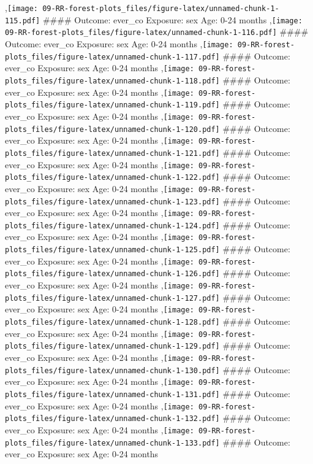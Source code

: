 \documentclass[
  9pt,
]{book}
\begin{document}
,\texttt{[image: 09-RR-forest-plots\_files/figure-latex/unnamed-chunk-1-115.pdf]}
\#\#\#\# Outcome: ever\_co Exposure: sex Age: 0-24 months
,\texttt{[image: 09-RR-forest-plots\_files/figure-latex/unnamed-chunk-1-116.pdf]}
\#\#\#\# Outcome: ever\_co Exposure: sex Age: 0-24 months
,\texttt{[image: 09-RR-forest-plots\_files/figure-latex/unnamed-chunk-1-117.pdf]}
\#\#\#\# Outcome: ever\_co Exposure: sex Age: 0-24 months
,\texttt{[image: 09-RR-forest-plots\_files/figure-latex/unnamed-chunk-1-118.pdf]}
\#\#\#\# Outcome: ever\_co Exposure: sex Age: 0-24 months
,\texttt{[image: 09-RR-forest-plots\_files/figure-latex/unnamed-chunk-1-119.pdf]}
\#\#\#\# Outcome: ever\_co Exposure: sex Age: 0-24 months
,\texttt{[image: 09-RR-forest-plots\_files/figure-latex/unnamed-chunk-1-120.pdf]}
\#\#\#\# Outcome: ever\_co Exposure: sex Age: 0-24 months
,\texttt{[image: 09-RR-forest-plots\_files/figure-latex/unnamed-chunk-1-121.pdf]}
\#\#\#\# Outcome: ever\_co Exposure: sex Age: 0-24 months
,\texttt{[image: 09-RR-forest-plots\_files/figure-latex/unnamed-chunk-1-122.pdf]}
\#\#\#\# Outcome: ever\_co Exposure: sex Age: 0-24 months
,\texttt{[image: 09-RR-forest-plots\_files/figure-latex/unnamed-chunk-1-123.pdf]}
\#\#\#\# Outcome: ever\_co Exposure: sex Age: 0-24 months
,\texttt{[image: 09-RR-forest-plots\_files/figure-latex/unnamed-chunk-1-124.pdf]}
\#\#\#\# Outcome: ever\_co Exposure: sex Age: 0-24 months
,\texttt{[image: 09-RR-forest-plots\_files/figure-latex/unnamed-chunk-1-125.pdf]}
\#\#\#\# Outcome: ever\_co Exposure: sex Age: 0-24 months
,\texttt{[image: 09-RR-forest-plots\_files/figure-latex/unnamed-chunk-1-126.pdf]}
\#\#\#\# Outcome: ever\_co Exposure: sex Age: 0-24 months
,\texttt{[image: 09-RR-forest-plots\_files/figure-latex/unnamed-chunk-1-127.pdf]}
\#\#\#\# Outcome: ever\_co Exposure: sex Age: 0-24 months
,\texttt{[image: 09-RR-forest-plots\_files/figure-latex/unnamed-chunk-1-128.pdf]}
\#\#\#\# Outcome: ever\_co Exposure: sex Age: 0-24 months
,\texttt{[image: 09-RR-forest-plots\_files/figure-latex/unnamed-chunk-1-129.pdf]}
\#\#\#\# Outcome: ever\_co Exposure: sex Age: 0-24 months
,\texttt{[image: 09-RR-forest-plots\_files/figure-latex/unnamed-chunk-1-130.pdf]}
\#\#\#\# Outcome: ever\_co Exposure: sex Age: 0-24 months
,\texttt{[image: 09-RR-forest-plots\_files/figure-latex/unnamed-chunk-1-131.pdf]}
\#\#\#\# Outcome: ever\_co Exposure: sex Age: 0-24 months
,\texttt{[image: 09-RR-forest-plots\_files/figure-latex/unnamed-chunk-1-132.pdf]}
\#\#\#\# Outcome: ever\_co Exposure: sex Age: 0-24 months
,\texttt{[image: 09-RR-forest-plots\_files/figure-latex/unnamed-chunk-1-133.pdf]}
\#\#\#\# Outcome: ever\_co Exposure: sex Age: 0-24 months
\end{document}
